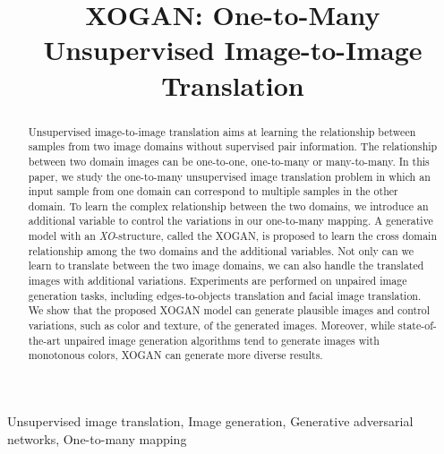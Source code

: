 \documentclass[conference]{IEEEtran}
\theoremstyle{definition}
\begin{document}
\title{XOGAN: One-to-Many Unsupervised Image-to-Image Translation}

\author{
}

\maketitle

\begin{abstract}
Unsupervised image-to-image translation aims at learning the relationship between samples from two image domains without supervised pair
information. The relationship between two domain images can be one-to-one, one-to-many or many-to-many. In this paper, we study the one-to-many
unsupervised image translation problem in which an input sample from one domain can correspond to multiple samples in the other domain. To learn the complex relationship between the two domains, we introduce an additional variable to control the variations in our one-to-many mapping. A
generative model
with an \textit{XO}-structure, called the XOGAN, is proposed to learn the cross domain relationship among the two domains and the additional
variables. Not only can we learn to translate between the two image domains, we can also handle the translated images with additional variations.
Experiments are performed on unpaired image generation tasks, including edges-to-objects translation and facial image translation. We show that
the proposed XOGAN model can generate plausible images and control variations, such as color and texture, of the generated images. Moreover, 
while state-of-the-art unpaired image generation algorithms tend to generate images with monotonous colors,
XOGAN
can generate more diverse results.
\end{abstract}

\vspace{5px}


\begin{IEEEkeywords}
Unsupervised image translation, Image generation, Generative adversarial networks, One-to-many mapping
\end{IEEEkeywords}
\end{document}
